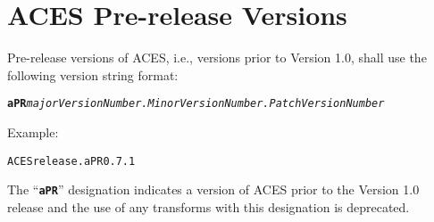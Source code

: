 \section{ACES Pre-release Versions}
Pre-release versions of ACES, i.e., versions prior to Version 1.0, shall use the following version string format:

\texttt{\textbf{aPR}\textit{majorVersionNumber.MinorVersionNumber.PatchVersionNumber}}

Example:
\begin{listize}
	\item \texttt{ACESrelease.aPR0.7.1}
\end{listize}

The ``\texttt{\textbf{aPR}}'' designation indicates a version of ACES prior to the Version 1.0 release and the use of any transforms with this designation is deprecated.